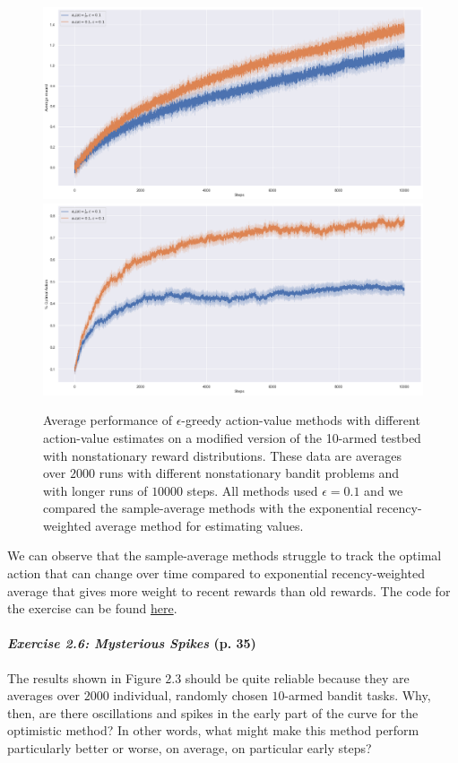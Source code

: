 \documentclass[10pt,a4paper]{article}
\begin{document}
\bigskip
\begin{figure}[h]
\centering
\includegraphics[width=\textwidth]{./non-stationary-testbed/images/avg_reward.png}
\includegraphics[width=\textwidth]{./non-stationary-testbed/images/percent_optimal_action.png}
\caption{Average performance of $\epsilon$-greedy action-value methods with different action-value estimates on a modified version of the 10-armed testbed with nonstationary reward distributions.
These data are averages over $2000$ runs with different nonstationary bandit problems and with longer runs of $10000$ steps. All methods used $\epsilon=0.1$ and we compared the sample-average methods with the exponential recency-weighted average method for estimating values.}
\end{figure}
We can observe that the sample-average methods struggle to track the optimal action that can change over time compared to exponential recency-weighted average that gives more weight to recent rewards than old rewards. The code for the exercise can be found \href{https://github.com/Zenchiyu/learning-rl/tree/develop/Intro_RL_Sutton_book/Chap2-Multi-Armed-Bandits/non-stationary-testbed#non-stationary-testbed}{here}.

\paragraph{\textit{Exercise 2.6: Mysterious Spikes} (p. 35)} The results shown in Figure $2.3$ should be quite reliable because they are averages over $2000$ individual, randomly chosen $10$-armed bandit tasks.
Why, then, are there oscillations and spikes in the early part of the curve for the optimistic method? In other words, what might make this method perform particularly better or worse, on average, on particular early steps?
\end{document}
